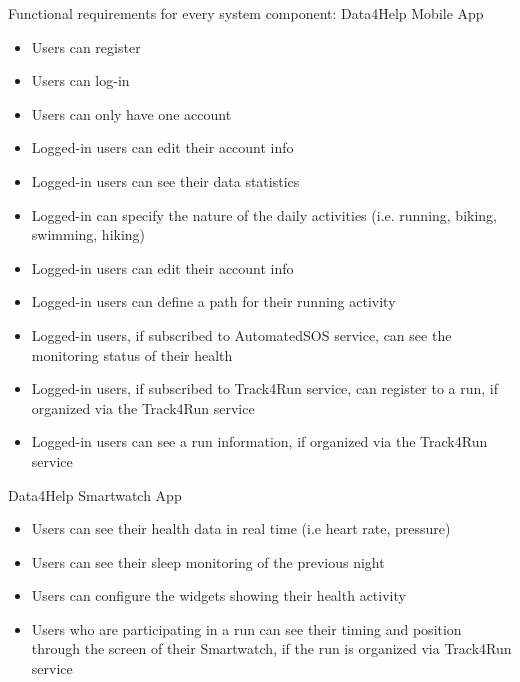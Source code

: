 Functional requirements for every system component:
\newline
Data4Help Mobile App
\begin{itemize}
    \item Users can register
    \item Users can log-in
    \item Users can only have one account
    \item Logged-in users can edit their account info
    \item Logged-in users can see their data statistics
    \item Logged-in can specify the nature of the daily activities (i.e. running, biking, swimming, hiking)
    \item Logged-in users can edit their account info
    \item Logged-in users can define a path for their running activity
    \item Logged-in users, if subscribed to AutomatedSOS service, can see the monitoring status of their health
    \item Logged-in users, if subscribed to Track4Run service, can register to a run, if organized via the Track4Run service
    \item Logged-in users can see a run information, if organized via the Track4Run service
\end{itemize}

\noindent Data4Help Smartwatch App
\begin{itemize}

    \item Users can see their health data in real time (i.e heart rate, pressure)
    \item Users can see their sleep monitoring of the previous night
    \item Users can configure the widgets showing their health activity
    \item Users who are participating in a run can see their timing and position through the screen of their Smartwatch, if the run is organized via Track4Run service
\end{itemize}

